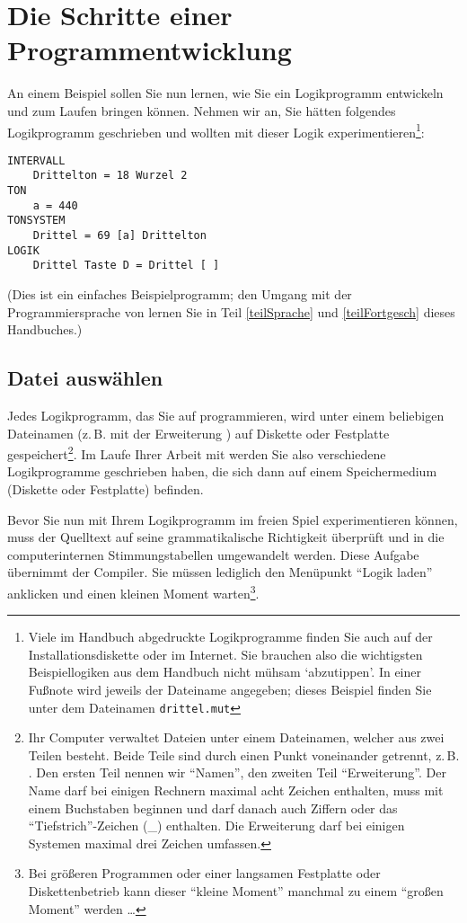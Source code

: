 \section{Die Schritte einer Pro\-gramm\-ent\-wick\-lung}\label{sec:die-schritte-einer}

An einem Beispiel sollen Sie nun lernen, wie Sie ein Logikprogramm
entwickeln und zum Laufen bringen können.  Nehmen wir an, Sie hätten
folgendes Logikprogramm geschrieben und wollten mit dieser Logik
experimentieren\footnote{Viele im Handbuch abgedruckte Logikprogramme
  finden Sie auch auf der Installationsdiskette oder im Internet. Sie
  brauchen also die wichtigsten Beispiellogiken aus dem Handbuch nicht
  mühsam `abzutippen'. In einer Fußnote wird jeweils der Dateiname
  angegeben; dieses Beispiel finden Sie unter dem Dateinamen
  \texttt{drittel.mut}}:
\label{DRITTEL}
\begin{verbatim}
INTERVALL
    Drittelton = 18 Wurzel 2
TON
    a = 440
TONSYSTEM
    Drittel = 69 [a] Drittelton
LOGIK
    Drittel Taste D = Drittel [ ]
\end{verbatim}

(Dies ist ein einfaches Beispielprogramm; den Umgang mit der
Programmiersprache von \mutabor{} lernen Sie in Teil \ref{teilSprache} und \ref{teilFortgesch} dieses Handbuches.)

\subsection{Datei auswählen}\label{sec:datei-auswahlen}

Jedes Logikprogramm, das Sie auf \mutabor{} programmieren, wird unter
einem beliebigen Dateinamen (z.\,B. mit der Erweiterung  )
auf Diskette oder Festplatte gespeichert\footnote{Ihr Computer
  verwaltet Dateien unter einem Dateinamen, welcher aus zwei Teilen
  besteht.  Beide Teile sind durch einen Punkt voneinander getrennt,
  z.\,B. .  Den ersten Teil nennen wir "`Namen"', den
  zweiten Teil "`Erweiterung"'. Der Name darf bei einigen Rechnern
  maximal acht Zeichen enthalten, muss mit einem Buchstaben beginnen
  und darf danach auch Ziffern oder das "`Tiefstrich"'-Zeichen (\_)
  enthalten. Die Erweiterung darf bei einigen Systemen maximal drei
  Zeichen umfassen.}. Im Laufe Ihrer Arbeit mit \mutabor{} werden Sie
also verschiedene Logikprogramme geschrieben haben, die sich dann auf
einem Speichermedium (Diskette oder Festplatte) befinden.

Bevor Sie nun mit Ihrem Logikprogramm im freien Spiel experimentieren
können, muss der Quelltext auf seine grammatikalische Richtigkeit
überprüft und in die computerinternen Stimmungstabellen umgewandelt werden. Diese
Aufgabe übernimmt der Compiler. Sie müssen lediglich den Menüpunkt
"`Logik laden"' anklicken und einen kleinen Moment 
warten\footnote{Bei größeren Programmen oder einer langsamen 
Festplatte oder Diskettenbetrieb kann dieser "`kleine Moment"' 
manchmal zu einem "`großen Moment"' werden \dots{}}.

